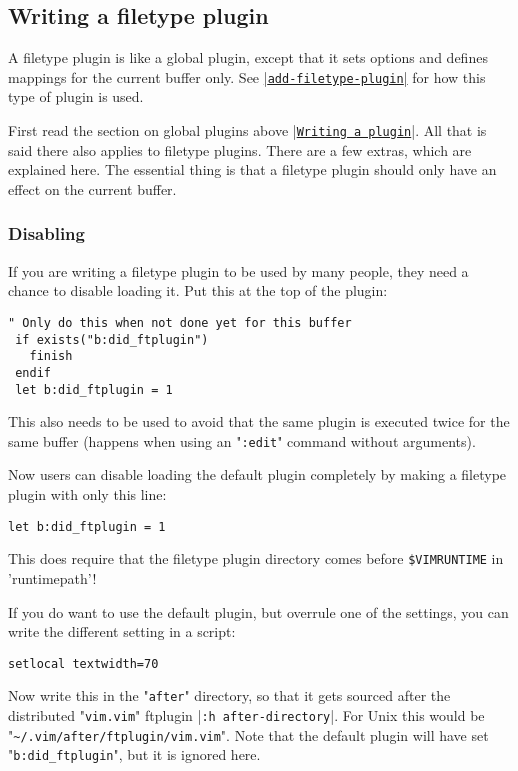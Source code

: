 \subsection{Writing a filetype plugin}
\label{write-filetype-plugin}
\label{ftplugin}
A filetype plugin is like a global plugin, except that it sets options and defines mappings for the current buffer only.
See \hyperref[add-filetype-plugin]{|\texttt{add-filetype-plugin}|} for how this type of plugin is used.

First read the section on global plugins above |\hyperref[Writing a plugin]{\texttt{Writing a plugin}}|.
All that is said there also applies to filetype plugins.
There are a few extras, which are explained here.
The essential thing is that a filetype plugin should only have an effect on the current buffer.

\subsubsection{Disabling}
If you are writing a filetype plugin to be used by many people, they need a chance to disable loading it.
Put this at the top of the plugin:

\begin{Verbatim}[samepage=true]
 " Only do this when not done yet for this buffer
 if exists("b:did_ftplugin")
   finish
 endif
 let b:did_ftplugin = 1
\end{Verbatim}

This also needs to be used to avoid that the same plugin is executed twice for the same buffer (happens when using an "\verb!:edit!" command without arguments).

Now users can disable loading the default plugin completely by making a filetype plugin with only this line:

\begin{Verbatim}[samepage=true]
 let b:did_ftplugin = 1
\end{Verbatim}

This does require that the filetype plugin directory comes before \verb!$VIMRUNTIME! in 'runtimepath'!

If you do want to use the default plugin, but overrule one of the settings, you can write the different setting in a script:

\begin{Verbatim}[samepage=true]
 setlocal textwidth=70
\end{Verbatim}

Now write this in the "\verb!after!" directory, so that it gets sourced after the distributed "\verb!vim.vim!" ftplugin |\verb!:h after-directory!|.
For Unix this would be "\verb!~/.vim/after/ftplugin/vim.vim!".
Note that the default plugin will have set "\verb!b:did_ftplugin!", but it is ignored here.

